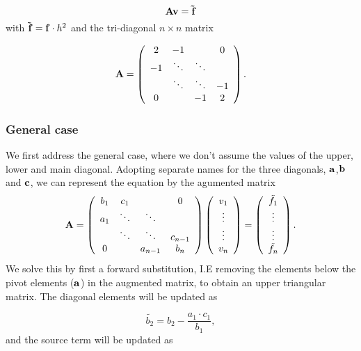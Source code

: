 \documentclass{emulateapj}
\begin{document}
\begin{equation}
    \bold{A}\bold{v} = \bold{\tilde{f}}
\end{equation}
with $\bold{\tilde{f}} = \bold{f}\cdot h^2$ and the tri-diagonal $n \times n$ matrix

\begin{equation} \label{eq:specialmatrix}
    \bold{A} = \left( \begin{array}{cccc}
2 & -1 & & 0\\
-1 & \ddots & \ddots & \\
& \ddots & \ddots & -1 \\
0 & & -1 & 2 \end{array} \right) .
\end{equation}

\subsubsection{General case}
We first address the general case, where we don't assume the values of the upper, lower and main diagonal. Adopting separate names for the three diagonals, $\bold{a}$,$\bold{b}$ and $\bold{c}$, we can represent the equation by the agumented matrix
\begin{equation} \label{eq:generalmatrix}
    \bold{A} = \left( \begin{array}{cccc}
b_{1} & c_1 & & 0 \\
a_1 & \ddots & \ddots & \\
& \ddots & \ddots & c_{n-1} \\
0 & & a_{n-1} & b_{n} \end{array} \right)
\left( \begin{array}{c}
v_1 \\
\vdots \\
\vdots \\
v_n
\end{array} \right)
= \left( \begin{array}{c}
\tilde{f_1} \\
\vdots \\
\vdots \\
\tilde{f_n}
\end{array} \right)
.
\end{equation}
We solve this by first a forward substitution, I.E removing the elements below the pivot elements ($\bold{a}$) in the augmented matrix, to obtain an upper triangular matrix. The diagonal elements will be updated as

\begin{equation}
    \tilde{b_2} = b_2 - \frac{a_1 \cdot c_1}{b_1},
\end{equation}
and the source term will be updated as
\end{document}
